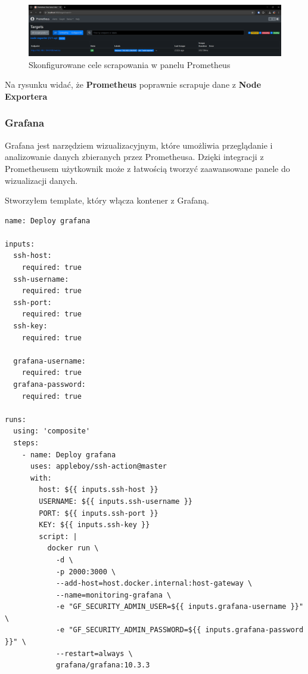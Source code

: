 \documentclass{article}
\begin{document}
\begin{figure}[H]
    \centering
    \includegraphics[width=1\linewidth]{prometheusSprawdzenieKonfiguracji.png}
    \caption{Skonfigurowane cele scrapowania w panelu Prometheus}
    \label{fig:enter-label}
\end{figure}

Na rysunku widać, że \textbf{Prometheus} poprawnie scrapuje dane z \textbf{Node Exportera}

\subsubsection{Grafana}

Grafana jest narzędziem wizualizacyjnym, które umożliwia przeglądanie i analizowanie danych zbieranych przez Prometheusa. Dzięki integracji z Prometheusem użytkownik może z łatwością tworzyć zaawansowane panele do wizualizacji danych.

Stworzyłem template, który włącza kontener z Grafaną.

\begin{lstlisting}[caption=Plik \texttt{.github/templates/deploy-grafana/action.yml}]
name: Deploy grafana

inputs:
  ssh-host:
    required: true
  ssh-username:
    required: true
  ssh-port:
    required: true
  ssh-key:
    required: true

  grafana-username:
    required: true
  grafana-password:
    required: true

runs:
  using: 'composite'
  steps:
    - name: Deploy grafana
      uses: appleboy/ssh-action@master
      with:
        host: ${{ inputs.ssh-host }}
        USERNAME: ${{ inputs.ssh-username }}
        PORT: ${{ inputs.ssh-port }}
        KEY: ${{ inputs.ssh-key }}
        script: |
          docker run \
            -d \
            -p 2000:3000 \
            --add-host=host.docker.internal:host-gateway \
            --name=monitoring-grafana \
            -e "GF_SECURITY_ADMIN_USER=${{ inputs.grafana-username }}" \
            -e "GF_SECURITY_ADMIN_PASSWORD=${{ inputs.grafana-password }}" \
            --restart=always \
            grafana/grafana:10.3.3
\end{lstlisting}
\end{document}
